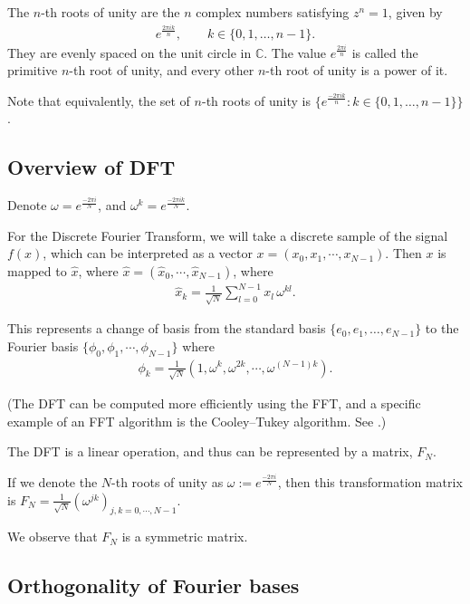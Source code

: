 \documentclass[11pt]{article}
\begin{document}
The $n$-th roots of unity are the $n$ complex numbers satisfying $z^n = 1$, given by
\begin{align*}
e^{\frac{2\pi i k}{n}}, \qquad k \in \{0, 1, \ldots, n-1\}.
\end{align*}
They are evenly spaced on the unit circle in $\mathbb{C}$. The value $e^{\frac{2\pi i}{n}}$ is called the primitive $n$-th root of unity, and every other $n$-th root of unity is a power of it.

Note that equivalently, the set of $n$-th roots of unity is $\{ e^{\frac{-2\pi i k}{n}} : k \in \{0, 1, \ldots, n-1\}\}$.

\subsection{Overview of DFT}

Denote $\omega = e^{\frac{-2\pi i}{N}}$, and $\omega^k = e^{\frac{-2\pi i k}{N}}$.

For the Discrete Fourier Transform, we will take a discrete sample of the signal $f(x)$, which can be interpreted as a vector $x = (x_0, x_1, \cdots, x_{N-1})$. Then $x$ is mapped to $\hat{x}$, where $\hat{x} = (\hat{x}_0, \cdots, \hat{x}_{N-1})$, where
\begin{align*}
\hat{x}_k = \frac{1}{\sqrt{N}}\sum_{l=0}^{N-1} x_l\, \omega^{kl}.
\end{align*}

This represents a change of basis from the standard basis $\{e_0, e_1, \ldots, e_{N-1}\}$ to the Fourier basis $\{\phi_0, \phi_1, \cdots, \phi_{N-1}\}$ where
\begin{align*}
\phi_k = \frac{1}{\sqrt{N}}\left(1, \omega^{k}, \omega^{2k}, \cdots, \omega^{(N-1)k}\right).
\end{align*}

(The DFT can be computed more efficiently using the FFT, and a specific example of an FFT algorithm is the Cooley--Tukey algorithm. See \cite{Barros_2026}.)

The DFT is a linear operation, and thus can be represented by a matrix, $F_N$.

If we denote the $N$-th roots of unity as $\omega := e^{\frac{-2\pi i}{N}}$, then this transformation matrix is $F_N = \frac{1}{\sqrt{N}}\left(\omega^{jk}\right)_{j,k = 0, \cdots, N-1}$.

We observe that $F_N$ is a symmetric matrix.

\subsection{Orthogonality of Fourier bases}
\end{document}

